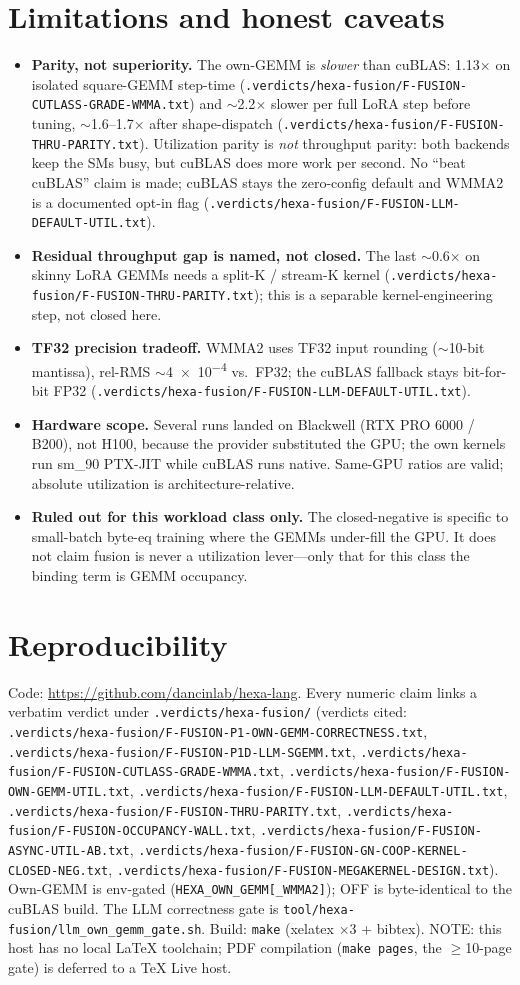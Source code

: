 \documentclass[11pt,a4paper]{article}
\newcommand{\vd}[1]{\texttt{.verdicts/hexa-fusion/#1.txt}}
\begin{document}
\section{Limitations and honest caveats}
\label{sec:limits}

\begin{itemize}\itemsep0.2em
\item \textbf{Parity, not superiority.} The own-GEMM is \emph{slower} than
cuBLAS: 1.13$\times$ on isolated square-GEMM step-time
(\vd{F-FUSION-CUTLASS-GRADE-WMMA}) and $\sim$2.2$\times$ slower per full LoRA step
before tuning, $\sim$1.6--1.7$\times$ after shape-dispatch
(\vd{F-FUSION-THRU-PARITY}). Utilization parity is \emph{not} throughput parity:
both backends keep the SMs busy, but cuBLAS does more work per second. No
``beat cuBLAS'' claim is made; cuBLAS stays the zero-config default and WMMA2 is a
documented opt-in flag (\vd{F-FUSION-LLM-DEFAULT-UTIL}).
\item \textbf{Residual throughput gap is named, not closed.} The last
$\sim$0.6$\times$ on skinny LoRA GEMMs needs a split-K / stream-K kernel
(\vd{F-FUSION-THRU-PARITY}); this is a separable kernel-engineering step, not
closed here.
\item \textbf{TF32 precision tradeoff.} WMMA2 uses TF32 input rounding
($\sim$10-bit mantissa), rel-RMS $\sim$\SI{4e-4}{} vs.\ FP32; the cuBLAS fallback
stays bit-for-bit FP32 (\vd{F-FUSION-LLM-DEFAULT-UTIL}).
\item \textbf{Hardware scope.} Several runs landed on Blackwell (RTX PRO 6000 /
B200), not H100, because the provider substituted the GPU; the own kernels run
sm\_90 PTX-JIT while cuBLAS runs native. Same-GPU ratios are valid; absolute
utilization is architecture-relative.
\item \textbf{Ruled out for this workload class only.} The closed-negative is
specific to small-batch byte-eq training where the GEMMs under-fill the GPU. It
does not claim fusion is never a utilization lever---only that for this class the
binding term is GEMM occupancy.
\end{itemize}

\section{Reproducibility}
\label{sec:repro}

Code: \url{https://github.com/dancinlab/hexa-lang}. Every numeric claim links a
verbatim verdict under \texttt{.verdicts/hexa-fusion/} (verdicts cited:
\vd{F-FUSION-P1-OWN-GEMM-CORRECTNESS}, \vd{F-FUSION-P1D-LLM-SGEMM},
\vd{F-FUSION-CUTLASS-GRADE-WMMA}, \vd{F-FUSION-OWN-GEMM-UTIL},
\vd{F-FUSION-LLM-DEFAULT-UTIL}, \vd{F-FUSION-THRU-PARITY},
\vd{F-FUSION-OCCUPANCY-WALL}, \vd{F-FUSION-ASYNC-UTIL-AB},
\vd{F-FUSION-GN-COOP-KERNEL-CLOSED-NEG},
\vd{F-FUSION-MEGAKERNEL-DESIGN}). Own-GEMM is env-gated
(\texttt{HEXA\_OWN\_GEMM[\_WMMA2]}); OFF is byte-identical to the cuBLAS build. The
LLM correctness gate is \texttt{tool/hexa-fusion/llm\_own\_gemm\_gate.sh}.
Build: \texttt{make} (xelatex $\times 3$ + bibtex). NOTE: this host has no local
LaTeX toolchain; PDF compilation (\texttt{make pages}, the $\geq$10-page gate) is
deferred to a TeX Live host.
\end{document}
